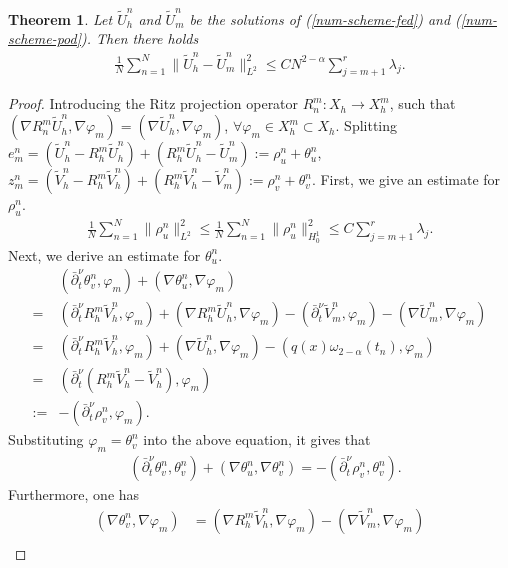 \documentclass[11pt]{article}
\newtheorem{theorem}{Theorem}
\numberwithin{equation}{section}
\begin{document}
\begin{theorem}\label{error-adj}
Let $\widetilde{U}_h^n$ and $\widetilde{U}_m^n$ be the solutions of (\ref{num-scheme-fed}) and (\ref{num-scheme-pod}). Then there holds 
\begin{align*} 
\frac{1}{N}\sum_{n=1}^N\|\widetilde{U}_h^n-\widetilde{U}_m^n\|_{L^2}^2\leq CN^{2-\alpha}\sum_{j=m+1}^r\lambda_j.    
\end{align*} 
\end{theorem}
\begin{proof}
Introducing the Ritz projection operator $R_n^m:X_h\rightarrow X_h^m$, such that $(\nabla R_n^m \widetilde{U}_h^n, \nabla \varphi_m)=(\nabla \widetilde{U}_h^n, \nabla \varphi_m)$, $\forall \varphi_m\in X_h^m\subset X_h$.  Splitting $e_m^n=(\widetilde{U}_h^n-R_h^m\widetilde{U}_h^n)+(R_h^m\widetilde{U}_h^n-\widetilde{U}_m^n):=\rho_u^n+\theta_u^n$, $z_m^n=(\widetilde{V}_h^n-R_h^m\widetilde{V}_h^n)+(R_h^m\widetilde{V}_h^n-\widetilde{V}_m^n):=\rho_v^n+\theta_v^n$. 
First, we give an estimate for $\rho_u^n$.
\begin{align}\label{pod-1}
\frac{1}{N}\sum_{n=1}^N\|\rho_u^n\|_{L^2}^2\leq \frac{1}{N}\sum_{n=1}^N\|\rho_u^n\|_{H_0^1}^2\leq C\sum_{j=m+1}^r\lambda_j.    
\end{align}
Next, we derive an estimate for $\theta_u^n$.
\begin{align*}
&(\bar\partial_t^\nu\theta_v^n,\varphi_m)+(\nabla\theta_u^n,\nabla\varphi_m)\\
=&(\bar\partial_t^\nu R_h^m\widetilde{V}_h^n,\varphi_m)+(\nabla R_h^m\widetilde{U}_h^n,\nabla\varphi_m)-(\bar\partial_t^\nu \widetilde{V}_m^n,\varphi_m)-(\nabla \widetilde{U}_m^n,\nabla\varphi_m)\\
=&(\bar\partial_t^\nu R_h^m\widetilde{V}_h^n,\varphi_m)+(\nabla \widetilde{U}_h^n,\nabla\varphi_m)-(q(x)\omega_{2-\alpha}(t_n),\varphi_m)\\
=&(\bar\partial_t^\nu (R_h^m\widetilde{V}_h^n-\widetilde{V}_h^n),\varphi_m)\\
:=&-(\bar\partial_t^\nu \rho_v^n,\varphi_m).
\end{align*}
Substituting $\varphi_m=\theta_v^n$ into the above equation, it gives that
\begin{align}\label{pod-2}
&(\bar\partial_t^\nu\theta_v^n,\theta_v^n)+(\nabla\theta_u^n,\nabla\theta_v^n)=-(\bar\partial_t^\nu \rho_v^n,\theta_v^n).
\end{align}
Furthermore, one has
\begin{align*}
(\nabla \theta_v^n,\nabla\varphi_m)
&=(\nabla R_h^m\widetilde{V}_h^n,\nabla\varphi_m)-(\nabla \widetilde{V}_m^n,\nabla\varphi_m)\\

\end{align*}
\end{proof}
\end{document}
